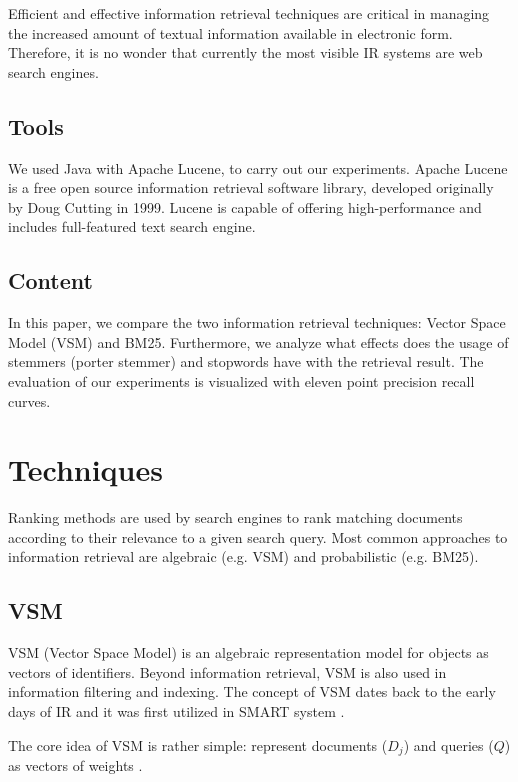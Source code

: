 Efficient and effective information retrieval techniques are critical in managing the increased amount of textual information available in electronic form. Therefore, it is no wonder that currently the most visible IR systems are web search engines.  

\subsection{Tools}


We used Java with Apache Lucene, to carry out our experiments. Apache Lucene is a free open source information retrieval software library, developed originally by Doug Cutting in 1999.  Lucene is capable of offering high-performance and includes full-featured text search engine.

\subsection{Content}

In this paper, we compare the two information retrieval techniques: Vector Space Model (VSM) and BM25. Furthermore, we analyze what effects does the usage of stemmers (porter stemmer) and stopwords have with the retrieval result. The evaluation of our experiments is visualized with eleven point precision recall curves. 



\section{Techniques}

Ranking methods are used by search engines to rank matching documents according to their relevance to a given search query. Most common approaches to information retrieval are algebraic (e.g. VSM) and probabilistic (e.g. BM25).

\subsection{VSM}

VSM (Vector Space Model) is an algebraic representation model for objects as vectors of identifiers. Beyond information retrieval, VSM is also used in information filtering and indexing. The concept of VSM dates back to the early days of IR and it was first utilized in SMART system \citep{dubin2004most}.

The core idea of VSM is rather simple: represent documents ($D_j$) and queries ($Q$) as vectors of weights \citep{Salton:1975:VSM:361219.361220}.

